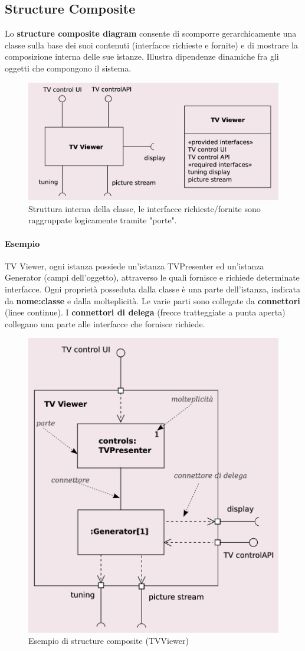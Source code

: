 \subsection{Structure Composite}

Lo \textbf{structure composite diagram} consente di scomporre gerarchicamente una classe sulla base dei suoi contenuti (interfacce richieste e fornite) e di mostrare la composizione interna delle sue istanze. Illustra dipendenze dinamiche fra gli oggetti che compongono il sistema.

\begin{figure}[H]
    \centering
    \includegraphics[width=0.75\linewidth]{assets/UML/struct_comp/struct_comp.png}
    \caption{Struttura interna della classe, le interfacce richieste/fornite sono raggruppate logicamente tramite "porte".}
\end{figure}

\paragraph{Esempio} TV Viewer, ogni istanza possiede un'istanza TVPresenter ed un'istanza Generator (campi dell'oggetto), attraverso le quali fornisce e richiede determinate interfacce. Ogni proprietà posseduta dalla classe è una parte dell'istanza, indicata da \textbf{nome:classe} e dalla molteplicità. Le varie parti sono collegate da \textbf{connettori} (linee continue). I \textbf{connettori di delega} (frecce tratteggiate a punta aperta) collegano una parte alle interfacce che fornisce richiede.

\begin{figure}[H]
    \centering
    \includegraphics[width=0.4\linewidth]{assets/UML/struct_comp/struct_comp2.png}
    \caption{Esempio di structure composite (TVViewer)}
\end{figure}

\newpage